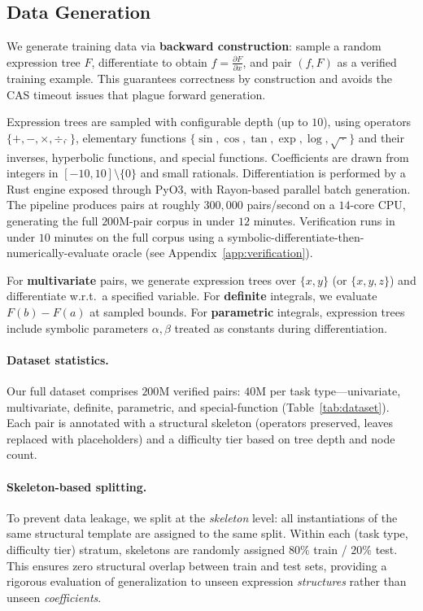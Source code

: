 \documentclass{article}
\begin{document}
\subsection{Data Generation}
\label{sec:datagen}

We generate training data via \textbf{backward construction}: sample a
random expression tree $F$, differentiate to obtain
$f = \tfrac{\partial F}{\partial x}$, and pair $(f, F)$ as a verified
training example. This guarantees correctness by construction and avoids
the CAS timeout issues that plague forward generation.

Expression trees are sampled with configurable depth (up to $10$), using
operators $\{+, -, \times, \div, \hat{}\,\}$, elementary functions
$\{\sin, \cos, \tan, \exp, \log, \sqrt{\,\cdot\,}\}$ and their inverses,
hyperbolic functions, and special functions. Coefficients are drawn from
integers in $[-10, 10] \setminus \{0\}$ and small rationals.
Differentiation is performed by a Rust engine exposed through PyO3, with
Rayon-based parallel batch generation. The pipeline produces pairs at
roughly $300{,}000$ pairs/second on a $14$-core CPU, generating the full
$200$M-pair corpus in under $12$ minutes. Verification runs in under
$10$ minutes on the full corpus using a
symbolic-differentiate-then-numerically-evaluate oracle (see
Appendix~\ref{app:verification}).

For \textbf{multivariate} pairs, we generate expression trees over
$\{x, y\}$ (or $\{x, y, z\}$) and differentiate w.r.t.\ a specified
variable. For \textbf{definite} integrals, we evaluate $F(b) - F(a)$ at
sampled bounds. For \textbf{parametric} integrals, expression trees
include symbolic parameters $\alpha, \beta$ treated as constants during
differentiation.

\paragraph{Dataset statistics.} Our full dataset comprises $200$M verified
pairs: $40$M per task type---univariate, multivariate, definite,
parametric, and special-function (Table~\ref{tab:dataset}). Each
pair is annotated with a structural skeleton (operators preserved, leaves
replaced with placeholders) and a difficulty tier based on tree depth and
node count.

\paragraph{Skeleton-based splitting.}
To prevent data leakage, we split at the \emph{skeleton} level: all
instantiations of the same structural template are assigned to the same
split. Within each (task type, difficulty tier) stratum, skeletons are
randomly assigned $80\%$ train / $20\%$ test. This ensures zero structural
overlap between train and test sets, providing a rigorous evaluation of
generalization to unseen expression \emph{structures} rather than unseen
\emph{coefficients}.
\end{document}
